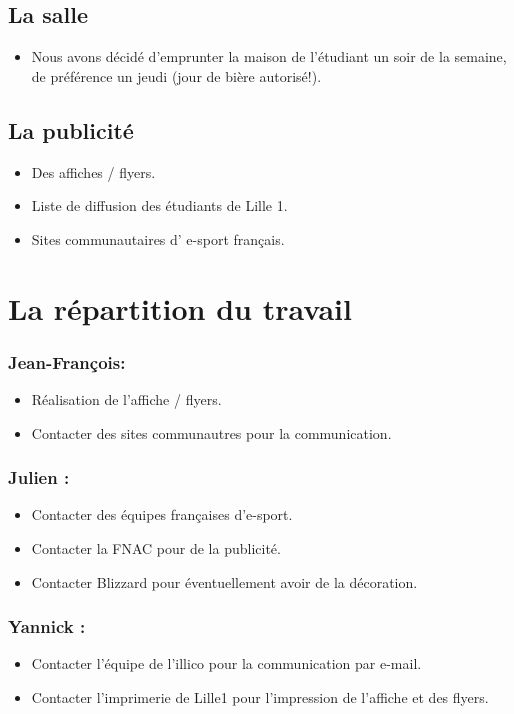 \subsection{La salle}
\begin{itemize}
\item Nous avons décidé d'emprunter la maison de l'étudiant un soir de la semaine, de préférence un jeudi (jour de bière autorisé!).
\end{itemize}

\subsection{La publicité}
\begin{itemize}
\item Des affiches / flyers.
\item Liste de diffusion des étudiants de Lille 1.
\item Sites communautaires d' \og e-sport \fg{} français.
\end{itemize}

\section{La répartition du travail}

\subsubsection{Jean-François:}
\begin{itemize}
\item Réalisation de l'affiche / flyers.
\item Contacter des sites communautres pour la communication.
\end{itemize}

\subsubsection{Julien :}
\begin{itemize}
\item Contacter des équipes françaises d'e-sport.
\item Contacter la FNAC pour de la publicité.
\item Contacter Blizzard pour éventuellement avoir de la décoration.
\end{itemize}

\subsubsection{Yannick :}
\begin{itemize}
\item Contacter l'équipe de l'illico pour la communication par e-mail.
\item Contacter l'imprimerie de Lille1 pour l'impression de l'affiche et des flyers.
\end{itemize}
